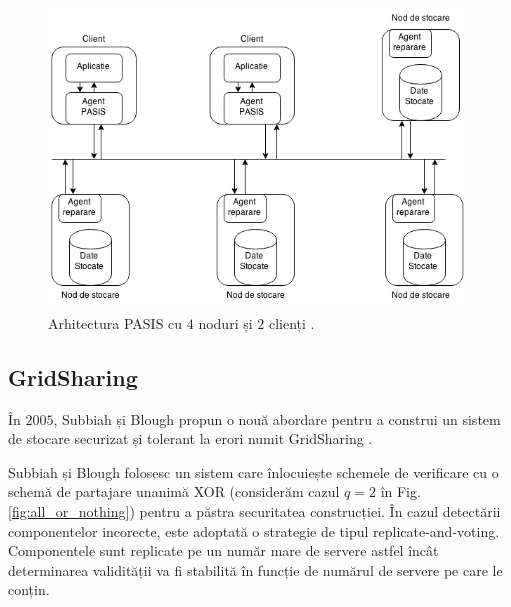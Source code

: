 \documentclass[oneside, 12pt]{book}
\begin{document}
\begin{figure}
	\includegraphics[width=11cm]{img/PASIS.png}
	\caption{Arhitectura PASIS cu $4$ noduri și $2$ clienți \cite{W:2000}.}
	\label{fig:pasis}
	\bigskip
\end{figure}



\subsection{GridSharing} 
\label{sec:desc_gridsharing}

În $2005$, Subbiah și Blough propun o nouă abordare pentru a construi un sistem de stocare securizat și tolerant la erori numit GridSharing \cite{SBM:2005}.

Subbiah și Blough folosesc un sistem care înlocuiește schemele de verificare cu o schemă de partajare unanimă XOR (considerăm cazul $q = 2$ în Fig. \ref{fig:all_or_nothing}) pentru a păstra securitatea construcției.
În cazul detectării componentelor incorecte, este adoptată o strategie de tipul replicate-and-voting.
Componentele sunt replicate pe un număr mare de servere astfel încât determinarea validității va fi stabilită în funcție de numărul de servere pe care le conțin.
\end{document}
